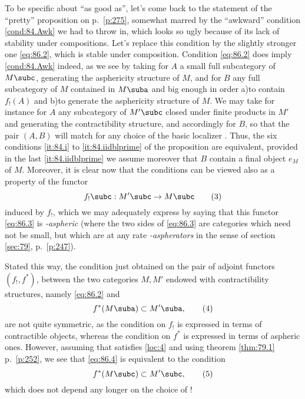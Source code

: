 To be specific about ``as good as'', let's come back to the statement
of the ``pretty'' proposition on p.\ \ref{p:275}, somewhat marred by
the ``awkward'' condition \ref{cond:84.Awk} we had to throw in, which
looks so ugly because of its lack of stability under
compositions. Let's replace this condition by the slightly stronger
one \eqref{eq:86.2}, which is stable under composition. Condition
\eqref{eq:86.2} does imply \ref{cond:84.Awk} indeed, as we see by
taking for $A$ a small full subcategory of $M\subc$, generating the
asphericity structure of $M$, and for $B$ any full subcategory of $M$
contained in $M\suba$ and big enough in order a)\enspace to contain
$f_!(A)$ and b)\enspace to generate the asphericity structure of
$M$. We may take for instance for $A$ any subcategory of $M'\subc$
closed under finite products in $M'$ and generating the
contractibility structure, and accordingly for $B$, so that the pair
$(A,B)$ will match for any choice of the basic localizer \scrW. Thus,
the six conditions \ref{it:84.i} to \ref{it:84.iidblprime} of the
proposition are equivalent, provided in the last
\ref{it:84.iidblprime} we assume moreover that $B$ contain a final
object $e_M$ of $M$. Moreover, it is clear now that the conditions can
be viewed also as a property of the functor
\begin{equation}
  \label{eq:86.3}
  {f_!}\subc : M'\subc \to M\subc\tag{3}
\end{equation}
induced by $f_!$, which we may adequately express by saying that this
functor \eqref{eq:86.3} is \emph{\scrW-aspheric} (where the two sides
of \eqref{eq:86.3} are categories which need not be small, but which
are at any rate \emph{\scrW-aspherators} in the sense of section
\ref{sec:79}, p.\ \ref{p:247}).

Stated this way, the condition just obtained on the pair
of adjoint functors $(f_!,f^*)$, between the two categories $M,M'$
endowed with contractibility structures, namely \eqref{eq:86.2} and
\begin{equation}
  \label{eq:86.4}
  f^*(M\suba)\subset M'\suba,\tag{4}
\end{equation}
are not quite symmetric, as the condition on $f_!$ is expressed in
terms of contractible objects, whereas the condition on $f^*$ is
expressed in terms of aspheric ones. However, assuming that \scrW{}
satisfies \ref{loc:4} and using theorem \ref{thm:79.1} p.\
\ref{p:252}, we see that \eqref{eq:86.4} is equivalent to the
condition
\begin{equation}
  \label{eq:86.5}
  f^*(M\subc)\subset M'\subc,\tag{5}
\end{equation}
which does not depend any longer on the choice of \scrW!

